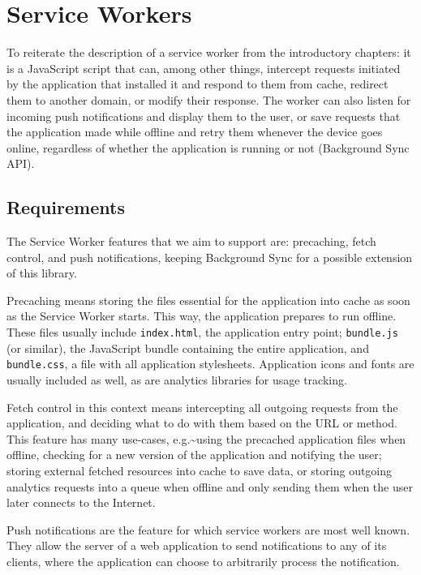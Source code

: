 \documentclass[english,odsaz]{fitthesis}
\begin{document}
\section{Service Workers}
\label{sec:orgeb22add}
To reiterate the description of a service worker from the introductory chapters:
it is a JavaScript script that can, among other things, intercept requests
initiated by the application that installed it and respond to them from cache,
redirect them to another domain, or modify their response. The worker can also
listen for incoming push notifications and display them to the user, or save
requests that the application made while offline and retry them whenever the
device goes online, regardless of whether the application is running or not
(Background Sync API).

\subsection{Requirements}
\label{sec:org528773e}
The Service Worker features that we aim to support are: precaching, fetch
control, and push notifications, keeping Background Sync for a possible
extension of this library.

Precaching means storing the files essential for the application into cache as
soon as the Service Worker starts. This way, the application prepares to run
offline. These files usually include \texttt{index.html}, the application entry point;
\texttt{bundle.js} (or similar), the JavaScript bundle containing the entire application,
and \texttt{bundle.css}, a file with all application stylesheets. Application icons and
fonts are usually included as well, as are analytics libraries for usage
tracking.

Fetch control in this context means intercepting all outgoing requests from the
application, and deciding what to do with them based on the URL or method. This
feature has many use-cases, e.g.\textasciitilde{}using the precached application files when
offline, checking for a new version of the application and notifying the user;
storing external fetched resources into cache to save data, or storing outgoing
analytics requests into a queue when offline and only sending them when the user
later connects to the Internet.

Push notifications are the feature for which service workers are most well
known. They allow the server of a web application to send notifications to any
of its clients, where the application can choose to arbitrarily process the
notification.
\end{document}

